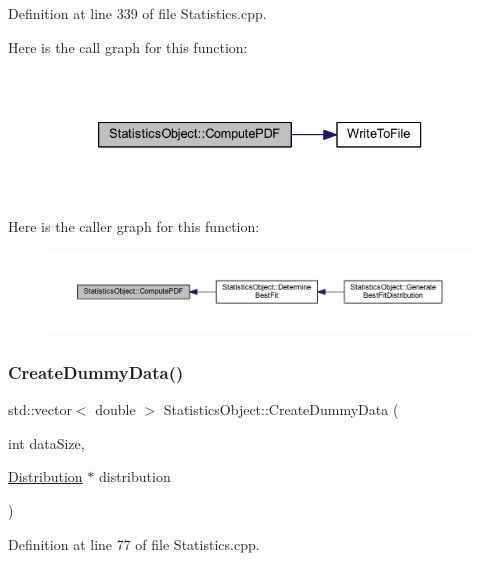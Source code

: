 Definition at line 339 of file Statistics.\+cpp.

Here is the call graph for this function\+:\nopagebreak
\begin{figure}[H]
\begin{center}
\leavevmode
\includegraphics[width=333pt]{class_statistics_object_ad89d69d36051851fe876b1ec28967c1e_cgraph}
\end{center}
\end{figure}
Here is the caller graph for this function\+:\nopagebreak
\begin{figure}[H]
\begin{center}
\leavevmode
\includegraphics[width=350pt]{class_statistics_object_ad89d69d36051851fe876b1ec28967c1e_icgraph}
\end{center}
\end{figure}
\mbox{\label{class_statistics_object_a8177bcf97b01750d125852b888e11323}} 
\subsubsection{\texorpdfstring{Create\+Dummy\+Data()}{CreateDummyData()}}
{\footnotesize\ttfamily std\+::vector$<$ double $>$ Statistics\+Object\+::\+Create\+Dummy\+Data (\begin{DoxyParamCaption}\item[{int}]{data\+Size,  }\item[{\hyperlink{class_distribution}{Distribution} $\ast$}]{distribution }\end{DoxyParamCaption})}



Definition at line 77 of file Statistics.\+cpp.

